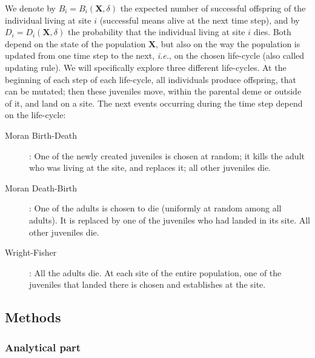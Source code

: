 \documentclass[11pt, letterpaper]{article}
\newcommand{\ie}{\textit{i.e.}}
\begin{document}
We denote by $B_i = B_i(\mathbf{X}, \delta)$ the expected number of successful offspring of the individual living at site $i$ (successful means alive at the next time step), and by $D_i = D_i(\mathbf{X}, \delta)$ the probability that the individual living at site $i$ dies. Both depend on the state of the population $\mathbf{X}$, but also on the way the population is updated from one time step to the next, \ie, on the chosen life-cycle (also called updating rule). We will specifically explore three different life-cycles. At the beginning of each step of each life-cycle, all individuals produce offspring, that can be mutated; then these juveniles move, within the parental deme or outside of it, and land on a site. The next events occurring during the time step depend on the life-cycle:
\begin{description}
\item[Moran Birth-Death]: One of the newly created juveniles is chosen at random; it kills the adult who was living at the site, and replaces it; all other juveniles die. 
\item[Moran Death-Birth]: One of the adults is chosen to die (uniformly at random among all adults). It is replaced by one of the juveniles who had landed in its site. All other juveniles die. 
\item[Wright-Fisher]: All the adults die. At each site of the entire population, one of the juveniles that landed there is chosen and establishes at the site. 
\end{description}
  
\subsection{Methods}
\subsubsection{Analytical part}
\end{document}

